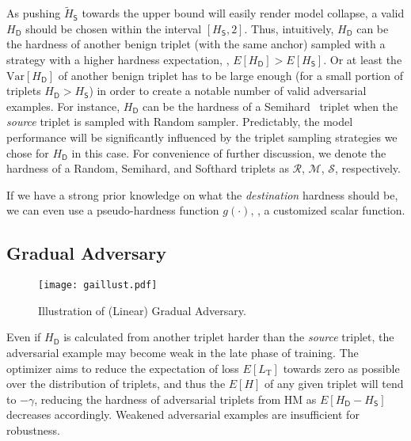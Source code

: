 \documentclass[10pt,twocolumn,letterpaper]{article}
\begin{document}
As pushing $\tilde{H}_\mathsf{S}$ towards the upper bound will easily render
model collapse, a valid $H_\mathsf{D}$ should be chosen within the interval
$[H_\mathsf{S},2]$.
%
Thus, intuitively, $H_\mathsf{D}$ can be the hardness of another benign triplet
(with the same anchor) sampled with a strategy with a higher hardness
expectation, \ie, $E[H_\mathsf{D}] > E[H_\mathsf{S}]$.
%
Or at least the $\text{Var}[H_\mathsf{D}]$ of another benign triplet has to
be large enough (for a small portion of triplets $H_\mathsf{D}>H_\mathsf{S}$)
in order to create a notable number of valid adversarial
examples.
%
For instance, $H_\mathsf{D}$ can be the hardness of a Semihard~\cite{facenet}
triplet when the \emph{source} triplet is sampled with Random sampler.
%
Predictably, the model performance will be significantly influenced by the
triplet sampling strategies we chose for $H_\mathsf{D}$ in this case.
%
For convenience of further discussion, we denote the hardness of a Random,
Semihard, and Softhard triplets as $\mathcal{R}$, $\mathcal{M}$, $\mathcal{S}$,
respectively.

If we have a strong prior knowledge on what the \emph{destination} hardness
should be, we can even use a pseudo-hardness function $g(\cdot)$, \ie, a
customized scalar function.



\subsection{Gradual Adversary}
\label{sec:32}

\begin{figure}
	\texttt{[image: gaillust.pdf]}
	\caption{Illustration of (Linear) Gradual Adversary.}
	\label{fig:ga}
\end{figure}



Even if $H_\mathsf{D}$ is calculated from another triplet harder than the
\emph{source} triplet, the adversarial example may become weak in the late
phase of training.
%
The optimizer aims to reduce the expectation of 
loss $E[L_\text{T}]$ towards zero as possible over the distribution of triplets, and thus
the $E[H]$ of any given triplet will tend to $-\gamma$, reducing the
hardness of adversarial triplets from HM as $E[H_\mathsf{D}-H_\mathsf{S}]$
decreases accordingly.
%
Weakened adversarial examples are insufficient for robustness.

\end{document}
